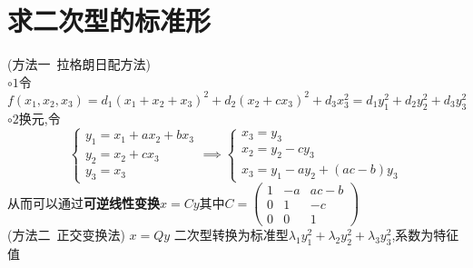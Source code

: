 \documentclass[12pt, a4paper, oneside, UTF8]{ctexbook}
\begin{document}
\section{求二次型的标准形}
\begin{definition}[常规方法]
    (方法一\ 拉格朗日配方法) \\
    $\circ 1$令$f(x_1,x_2,x_3)=d_1(x_1+x_2+x_3)^2+d_2(x_2+cx_3)^2+d_3x_3^2 = d_1y_1^2+d_2y_2^2+d_3y_3^2$ \\
    $\circ 2$换元,令
    $$\begin{cases}
        y_1 =x_1+ax_2+bx_3 \\
        y_2 =x_2+cx_3 \\
        y_3 =x_3
    \end{cases}\implies \begin{cases}
        x_3 = y_3 \\
        x_2 = y_2 -cy_3 \\
        x_3 = y_1 - ay_2 + (ac-b)y_3 
    \end{cases}$$
    从而可以通过\textbf{可逆线性变换}$x=Cy$其中$C=\begin{pmatrix}
        1 & -a & ac-b \\
        0 & 1 & -c \\
        0 & 0 & 1
    \end{pmatrix}$ \\
    (方法二\ 正交变换法) $x=Qy$ 二次型转换为标准型$\lambda_1y_1^2+\lambda_2y_2^2+\lambda_3y_3^2$,系数为特征值 
\end{definition}
\end{document}
